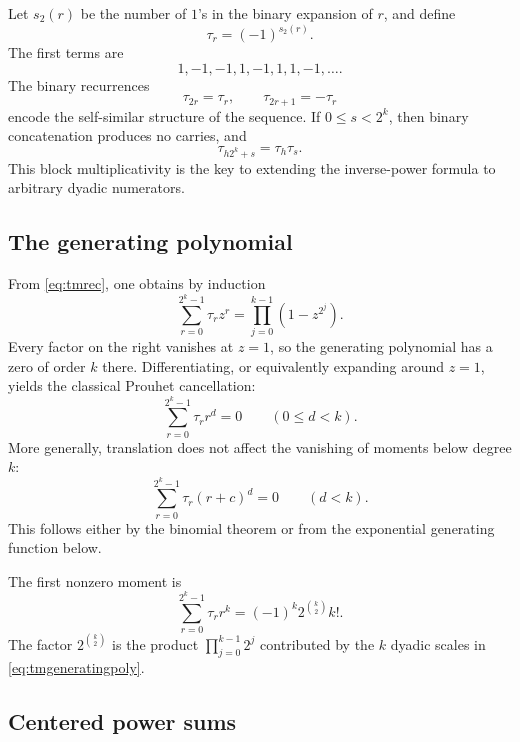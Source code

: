 \documentclass[11pt,oneside]{article}
\theoremstyle{definition}
\theoremstyle{remark}
\newcommand{\tm}{\tau}
\begin{document}
Let $s_2(r)$ be the number of $1$'s in the binary expansion of $r$, and define
\begin{equation}\label{eq:tmdef}
 \tm_r=(-1)^{s_2(r)}.
\end{equation}
The first terms are
\[
 1,-1,-1,1,-1,1,1,-1,\ldots.
\]
The binary recurrences
\begin{equation}\label{eq:tmrec}
 \tm_{2r}=\tm_r,
 \qquad
 \tm_{2r+1}=-\tm_r
\end{equation}
encode the self-similar structure of the sequence.  If $0\le s<2^k$, then binary concatenation produces no carries, and
\begin{equation}\label{eq:tmblockmult}
 \tm_{h2^k+s}=\tm_h\tm_s.
\end{equation}
This block multiplicativity is the key to extending the inverse-power formula to arbitrary dyadic numerators.

\subsection{The generating polynomial}

From \eqref{eq:tmrec}, one obtains by induction
\begin{equation}\label{eq:tmgeneratingpoly}
 \sum_{r=0}^{2^k-1}\tm_r z^r
 =\prod_{j=0}^{k-1}(1-z^{2^j}).
\end{equation}
Every factor on the right vanishes at $z=1$, so the generating polynomial has a zero of order $k$ there.  Differentiating, or equivalently expanding around $z=1$, yields the classical Prouhet cancellation:
\begin{equation}\label{eq:prouhet}
 \sum_{r=0}^{2^k-1}\tm_r r^d=0
 \qquad(0\le d<k).
\end{equation}
More generally, translation does not affect the vanishing of moments below degree $k$:
\begin{equation}\label{eq:prouhettranslate}
 \sum_{r=0}^{2^k-1}\tm_r(r+c)^d=0
 \qquad(d<k).
\end{equation}
This follows either by the binomial theorem or from the exponential generating function below.

The first nonzero moment is
\begin{equation}\label{eq:prouhetfirst}
 \sum_{r=0}^{2^k-1}\tm_r r^k
 =(-1)^k2^{\binom{k}{2}}k!.
\end{equation}
The factor $2^{\binom{k}{2}}$ is the product $\prod_{j=0}^{k-1}2^j$ contributed by the $k$ dyadic scales in \eqref{eq:tmgeneratingpoly}.

\subsection{Centered power sums}
\end{document}
